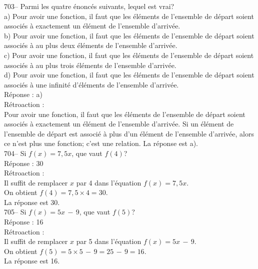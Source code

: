 ﻿\documentclass[letterpaper, 12pt]{article}
\begin{document}
703-- Parmi les quatre \'enonc\'es suivants, lequel est vrai?\\
a) Pour avoir une fonction, il faut que les \'el\'ements de
l'ensemble de d\'epart soient associ\'es \`a exactement un
\'el\'ement de l'ensemble
d'arriv\'ee.\\
b) Pour avoir une fonction, il faut que les \'el\'ements de l'ensemble de
d\'epart soient associ\'es \`a au plus deux \'el\'ements de l'ensemble
d'arriv\'ee.\\
c) Pour avoir une fonction, il faut que les \'el\'ements de l'ensemble de
d\'epart soient associ\'es \`a au plus trois \'el\'ements de l'ensemble
d'arriv\'ee.\\
d) Pour avoir une fonction, il faut que les \'el\'ements de l'ensemble de
d\'epart soient associ\'es \`a une infinit\'e d'\'el\'ements de l'ensemble
d'arriv\'ee.\\

R\'eponse : a)\\

R\'etroaction : \\
Pour avoir une fonction, il faut que les \'el\'ements de l'ensemble
de d\'epart soient associ\'es \`a exactement un \'el\'ement de
l'ensemble d'arriv\'ee.  Si un \'el\'ement de l'ensemble de d\'epart
est associ\'e \`a plus d'un \'el\'ement de l'ensemble d'arriv\'ee,
alors ce n'est plus une
fonction; c'est une relation.  La r\'eponse est a).\\

704-- Si $f(x)=7,5x$, que vaut $f(4)$?\\

R\'eponse : 30\\

R\'etroaction : \\
Il suffit de remplacer $x$ par 4 dans l'\'equation $f(x)=7,5x$.  \\
On obtient $f(4)=7,5\times4=30$.\\
La r\'eponse est 30.\\

705-- Si $f(x)=5x\,-\,9$, que vaut  $f(5)$?\\

R\'eponse :  16\\

R\'etroaction :  \\
Il suffit de remplacer $x$ par 5 dans l'\'equation $ f(x)=5x\,-\,9$.\\
On obtient $f(5)=5\times 5\,-\,9=25\,-\,9=16$.\\
La r\'eponse est 16.\\
\end{document}
